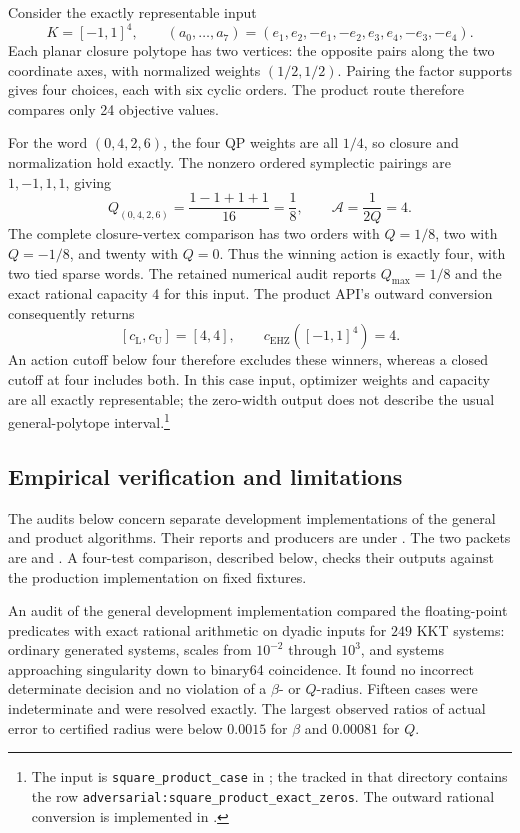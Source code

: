 Consider the exactly representable input
\[
 K=[-1,1]^4,\qquad
 (a_0,\ldots,a_7)=(e_1,e_2,-e_1,-e_2,e_3,e_4,-e_3,-e_4).
\]
Each planar closure polytope has two vertices: the opposite pairs along
the two coordinate axes, with normalized weights $(1/2,1/2)$. Pairing the
factor supports gives four choices, each with six cyclic orders. The
product route therefore compares only 24 objective values.

For the word $(0,4,2,6)$, the four QP weights are all $1/4$, so closure
and normalization hold exactly. The nonzero ordered symplectic pairings
are $1,-1,1,1$, giving
\[
 Q_{(0,4,2,6)}=\frac{1-1+1+1}{16}=\frac18,
 \qquad \mathcal A=\frac1{2Q}=4.
\]
The complete closure-vertex comparison has two orders with $Q=1/8$,
two with $Q=-1/8$, and twenty with $Q=0$. Thus the winning action is
exactly four, with two tied sparse words. The retained numerical audit
reports $Q_{\max}=1/8$ and the exact rational capacity $4$ for this input.
The product API's outward conversion consequently returns
\[
 [c_{\mathrm L},c_{\mathrm U}]=[4,4],
 \qquad c_{\mathrm{EHZ}}([-1,1]^4)=4.
\]
An action cutoff below four therefore excludes these winners, whereas
a closed cutoff at four includes both. In this case input, optimizer
weights and capacity are all exactly representable; the zero-width output
does not describe the usual general-polytope interval.\footnote{\raggedright The input is
\texttt{square\_product\_case} in
;
the tracked  in that directory contains the row
\texttt{adversarial:square\_product\_exact\_zeros}.
The outward rational conversion is implemented in
.}

\subsection{Empirical verification and limitations}

The audits below concern separate development implementations of the general
and product algorithms. Their reports and producers are under
.
The two packets are  and
. A four-test comparison, described below, checks their outputs
against the production implementation on fixed fixtures.

An audit of the general development implementation compared the floating-point
predicates with exact rational arithmetic on dyadic inputs for \(249\) KKT systems: ordinary generated systems,
scales from \(10^{-2}\) through \(10^3\), and systems approaching singularity
down to binary64 coincidence.  It found no incorrect determinate decision and
no violation of a \(\beta\)- or \(Q\)-radius.  Fifteen cases were
indeterminate and were resolved exactly.  The largest observed ratios of
actual error to certified radius were below \(0.0015\) for \(\beta\) and
\(0.00081\) for \(Q\).

